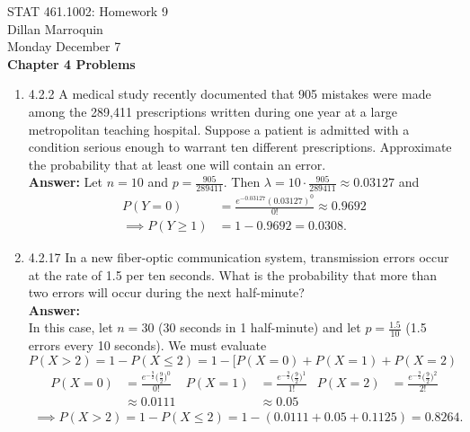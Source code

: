 \documentclass{article}
\begin{document}
    \noindent STAT 461.1002: Homework 9\\
    Dillan Marroquin\\
    Monday December 7\\

    \noindent \textbf{Chapter 4 Problems}
    \begin{enumerate}
        \item 4.2.2 A medical study recently documented that 905 mistakes were made among the 289,411 prescriptions written during one year at a large metropolitan teaching hospital. Suppose a patient is admitted with a condition serious enough to warrant ten different prescriptions. Approximate the probability that at least one will contain an error.\\
        \textbf{Answer: } Let $n=10$ and $p = \frac{905}{289411}$. Then $\lambda = 10\cdot \frac{905}{289411} \approx 0.03127$ and
            \begin{align*}
                P(Y=0) &= \frac{e^{-0.03127}(0.03127)^0}{0!} \approx 0.9692\\
                \implies P(Y \geq 1) &= 1-0.9692 = 0.0308. 
            \end{align*}
        
        \item 4.2.17 In a new fiber-optic communication system, transmission errors occur at the rate of 1.5 per ten seconds. What is the probability that more than two errors will occur during the next half-minute?\\
        \textbf{Answer: }\\In this case, let $n=30$ (30 seconds in 1 half-minute) and let $p=\frac{1.5}{10}$ (1.5 errors every 10 seconds). We must evaluate $P(X>2) = 1-P(X\leq 2) = 1-[P(X=0)+P(X=1)+P(X=2)$
            \begin{align*}
                P(X=0) &= \frac{e^{-\frac{9}{2}}\big(\frac{9}{2}\big)^0}{0!}       &       P(X=1) &= \frac{e^{-\frac{9}{2}}\big(\frac{9}{2}\big)^1}{1!}       &       P(X=2) &= \frac{e^{-\frac{9}{2}}\big(\frac{9}{2}\big)^2}{2!}\\
                &\approx 0.0111        &       &\approx 0.05
            \end{align*}
            \begin{align*}
                \implies P(X > 2) = 1-P(X \leq 2) = 1-(0.0111+0.05+0.1125) = 0.8264.
            \end{align*}
        

\end{enumerate}
\end{document}

